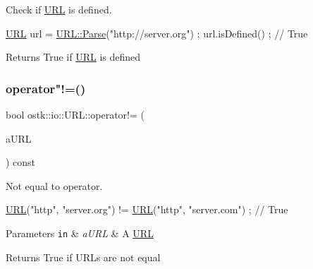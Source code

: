 Check if \hyperlink{classostk_1_1io_1_1_u_r_l}{U\+RL} is defined. 


\begin{DoxyCode}
\hyperlink{classostk_1_1io_1_1_u_r_l_a2537e046cef4ac966cc295abb81279c2}{URL} url = \hyperlink{classostk_1_1io_1_1_u_r_l_a1cd7216bb1079f62386a218ba510958d}{URL::Parse}(\textcolor{stringliteral}{"http://server.org"}) ;
url.isDefined() ; \textcolor{comment}{// True}
\end{DoxyCode}


\begin{DoxyReturn}{Returns}
True if \hyperlink{classostk_1_1io_1_1_u_r_l}{U\+RL} is defined 
\end{DoxyReturn}
\mbox{\label{classostk_1_1io_1_1_u_r_l_af0e7f1e614d4268332deb8255cfd042a}} 
\subsubsection{\texorpdfstring{operator"!=()}{operator!=()}}
{\footnotesize\ttfamily bool ostk\+::io\+::\+U\+R\+L\+::operator!= (\begin{DoxyParamCaption}\item[{const \hyperlink{classostk_1_1io_1_1_u_r_l}{U\+RL} \&}]{a\+U\+RL }\end{DoxyParamCaption}) const}



Not equal to operator. 


\begin{DoxyCode}
\hyperlink{classostk_1_1io_1_1_u_r_l_a2537e046cef4ac966cc295abb81279c2}{URL}(\textcolor{stringliteral}{"http"}, \textcolor{stringliteral}{"server.org"}) != \hyperlink{classostk_1_1io_1_1_u_r_l_a2537e046cef4ac966cc295abb81279c2}{URL}(\textcolor{stringliteral}{"http"}, \textcolor{stringliteral}{"server.com"}) ; \textcolor{comment}{// True}
\end{DoxyCode}



\begin{DoxyParams}[1]{Parameters}
\mbox{\tt in}  & {\em a\+U\+RL} & A \hyperlink{classostk_1_1io_1_1_u_r_l}{U\+RL} \\
\hline
\end{DoxyParams}
\begin{DoxyReturn}{Returns}
True if U\+R\+Ls are not equal 
\end{DoxyReturn}
\mbox{\label{classostk_1_1io_1_1_u_r_l_a6af6a4ec30e137242a80b51096ef09b2}} 
